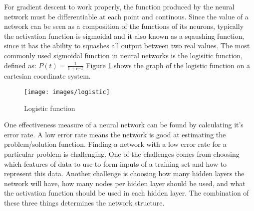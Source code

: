 
For gradient descent to work properly, the function produced by the neural network must be
differentiable at each point and continous. 
Since the value of a network can be seen as a composition of the
functions of its neurons, typically the activation function is sigmoidal and it also known as a sqaushing function, since it has the ability to squashes all output between two real values\cite{mitchell1997}.
The most commonly used sigmoidal function in neural networks is the logisitic function, defined as:
$P(t) = \frac{1}{1 + e^-t}$
Figure \ref{logistic} shows the graph of the logistic function on a cartesian coordinate system.

\begin{figure}[h!]
  \centering
  \texttt{[image: images/logistic]}
  \caption{Logistic function}
  \label{logistic}
\end{figure}








One effectiveness measure of a neural network can be found by calculating it's error rate. A low error rate means the network is good at estimating the problem/solution function. Finding a network with a low error rate for a particular problem is challenging. One of the challenges comes from choosing which features of data to use to form inputs of a training set and how to represent this data. Another challenge is choosing how many hidden layers the network will have, how many nodes per hidden layer should be used, and what the activation function should be used in each hidden layer. The combination of these three things determines the network structure. 



